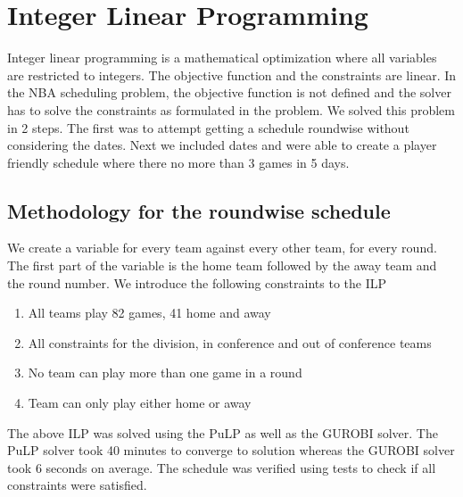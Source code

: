 \documentclass{article}
\begin{document}
	\section{Integer Linear Programming}
	Integer linear programming is a mathematical optimization where all variables are restricted to integers. The objective function and the constraints are linear. In the NBA scheduling problem, the objective function is not defined and the solver has to solve the constraints as formulated in the problem. We solved this problem in 2 steps. The first was to attempt getting a schedule roundwise without considering the dates. Next we included dates and were able to create a player friendly schedule where there no more than 3 games in 5 days.
	
	\subsection{Methodology for the roundwise schedule}
	We create a variable for every team against every other team, for every round. The first part of the variable is the home team followed by the away team and the round number. We introduce the following constraints to the ILP
	\begin{enumerate}
		\item All teams play 82 games, 41 home and away
		\item All constraints for the division, in conference and out of conference teams
		\item No team can play more than one game in a round
		\item Team can only play either home or away
	\end{enumerate}
	The above ILP was solved using the PuLP as well as the GUROBI solver. The PuLP solver took 40 minutes to converge to solution whereas the GUROBI solver took 6 seconds on average. The schedule was verified using tests to check if all constraints were satisfied.
	
\end{document}
